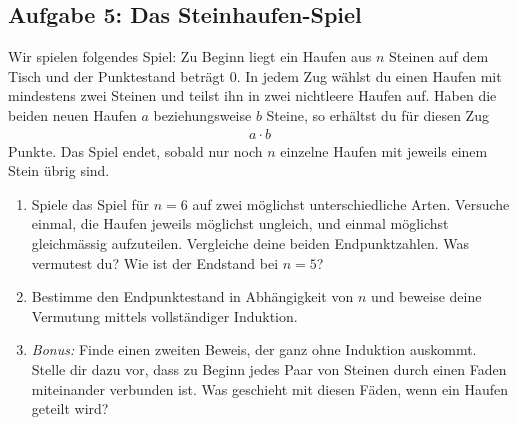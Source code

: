 \documentclass[a4paper,10pt]{article}
\begin{document}
\subsection*{Aufgabe 5: Das Steinhaufen-Spiel}

Wir spielen folgendes Spiel: Zu Beginn liegt ein Haufen aus $n$ Steinen auf dem Tisch und der Punktestand beträgt $0$. In jedem Zug wählst du einen Haufen mit mindestens zwei Steinen und teilst ihn in zwei nichtleere Haufen auf. Haben die beiden neuen Haufen $a$ beziehungsweise $b$ Steine, so erhältst du für diesen Zug
\begin{align*}
    a\cdot b
\end{align*}
Punkte. Das Spiel endet, sobald nur noch $n$ einzelne Haufen mit jeweils einem Stein übrig sind.

\begin{enumerate}[label=(\alph*)]
    \item Spiele das Spiel für $n=6$ auf zwei möglichst unterschiedliche Arten. Versuche einmal, die Haufen jeweils möglichst ungleich, und einmal möglichst gleichmässig aufzuteilen. Vergleiche deine beiden Endpunktzahlen. Was vermutest du? Wie ist der Endstand bei $n=5$?

    \item Bestimme den Endpunktestand in Abhängigkeit von $n$ und beweise deine Vermutung mittels vollständiger Induktion.

    \item[(c*)] \textit{Bonus:} Finde einen zweiten Beweis, der ganz ohne Induktion auskommt. Stelle dir dazu vor, dass zu Beginn jedes Paar von Steinen durch einen Faden miteinander verbunden ist. Was geschieht mit diesen Fäden, wenn ein Haufen geteilt wird?
\end{enumerate}
\end{document}
